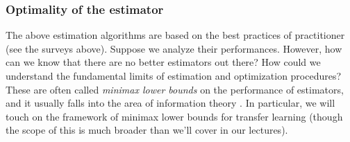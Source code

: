 \subsubsection{Optimality of the estimator}

The above estimation algorithms are based on the best practices of practitioner (see the surveys above).
Suppose we analyze their performances. However, how can we know that there are no better estimators out there?
How could we understand the fundamental limits of estimation and optimization procedures?
These are often called \emph{minimax lower bounds} on the performance of estimators, and it usually falls into the area of information theory \citep{duchi2016lecture}.
In particular, we will touch on the framework of minimax lower bounds for transfer learning (though the scope of this is much broader than we'll cover in our lectures).
